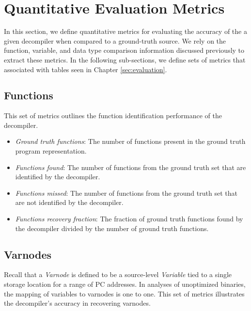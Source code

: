 \section{Quantitative Evaluation Metrics}

In this section, we define quantitative metrics for evaluating the accuracy of the a given decompiler when compared to a ground-truth source. We rely on the function, variable, and data type comparison information discussed previously to extract these metrics. In the following sub-sections, we define sets of metrics that associated with tables seen in Chapter \ref{sec:evaluation}.

\subsection{Functions}

This set of metrics outlines the function identification performance of the decompiler.

\begin{itemize}
    \item \emph{Ground truth functions}: The number of functions present in the ground truth program representation.
    \item \emph{Functions found}: The number of functions from the ground truth set that are identified by the decompiler.
    \item \emph{Functions missed}: The number of functions from the ground truth set that are not identified by the decompiler.
    \item \emph{Functions recovery fraction}: The fraction of ground truth functions found by the decompiler divided by the number of ground truth functions.
\end{itemize}

\subsection{Varnodes}

Recall that a \emph{Varnode} is defined to be a source-level \emph{Variable} tied to a single storage location for a range of PC addresses. In analyses of unoptimized binaries, the mapping of variables to varnodes is one to one. This set of metrics illustrates the decompiler's accuracy in recovering varnodes.

